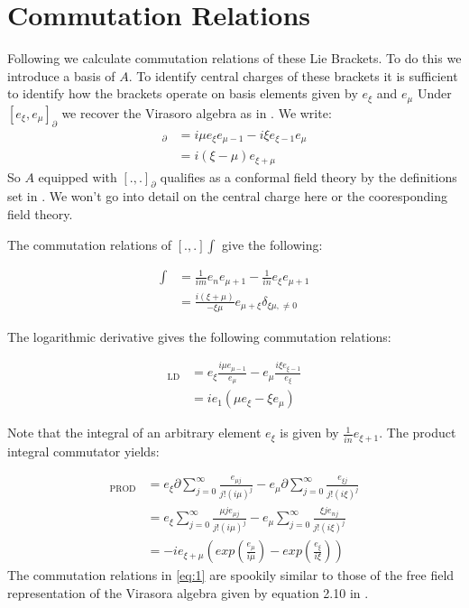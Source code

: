 \documentclass[10pt, oneside]{article}
\begin{document}
\section{Commutation Relations}
   Following \cite{teschner2017guidetwodimensionalconformalfield} \cite{Kac1990} \cite{Schottenloher1997} we calculate commutation relations of these Lie Brackets. To do this we introduce a basis of $A$. 
   To identify central charges of these brackets it is sufficient to identify how the brackets operate on basis elements given by $e_\xi$ and $e_\mu$
      Under $[e_\xi,e_\mu]_\partial$ we recover the Virasoro algebra as in \cite{teschner2017guidetwodimensionalconformalfield}. We write:
      \begin{align*}
         [e_\xi,e_\mu]_\partial &= i \mu e_\xi e_{\mu-1} - i \xi e_{\xi-1} e_\mu \\
         &= i(\xi-\mu)e_{\xi +\mu}
      \end{align*}
      So $A$ equipped with $[.,.]_\partial$ qualifies as a conformal field theory by the definitions set in \cite{teschner2017guidetwodimensionalconformalfield}.
      We won't go into detail on the central charge here or the cooresponding field theory. 

      The commutation relations of $[.,.]\int$ give the following:

      \begin{align*}
         [e_{\xi},e_\mu]\int &= \frac{1}{i m} e_{n} e_{\mu+1} - \frac{1}{i n} e_{\xi} e_{\mu+1} \\
         &= \frac{i(\xi +\mu)}{-\xi \mu} e_{\mu+\xi} \delta_{\xi \mu,\not = 0}
      \end{align*}

      The logarithmic derivative gives the following commutation relations:

      \begin{align*}
         [e_{\xi},e_\mu]_\text{LD} &= e_{\xi} \frac{i \mu e_{\mu-1}}{e_{\mu}} - e_\mu \frac{i \xi e_{\xi-1}}{e_{\xi}} \\
         &= i e_1 (\mu e_{\xi} - \xi e_\mu)
      \end{align*}
 
      Note that the integral of an arbitrary element $e_{\xi}$ is given by $\frac{1}{in} e_{\xi+1}$. The product integral commutator yields: 
   
      \begin{align}
         [e_{\xi}, e_\mu]_\text{PROD} &= e_{\xi} \partial \sum_{j=0}^{\infty} \frac{e_{\mu j}}{j! (i\mu)^j} - e_\mu \partial \sum_{j=0}^{\infty} \frac{e_{\xi j}}{j! (i \xi)^j} \nonumber \\
         &= e_{\xi} \sum_{j=0}^\infty \frac{\mu j e_{\mu j}}{j! (i\mu)^j} - e_\mu \sum_{j=0}^\infty \frac{\xi j e_{nj}}{j! (i \xi)^j} \nonumber \\
         &= -i e_{\xi+\mu} (exp(\frac{e_\mu}{i\mu}) - exp(\frac{e_{\xi}}{i\xi})) \label{eq:1}
      \end{align}
      The commutation relations in \ref{eq:1} are spookily similar to those of the free field representation of the Virasora algebra given by equation 2.10 in \cite{teschner2017guidetwodimensionalconformalfield}.
\end{document}
